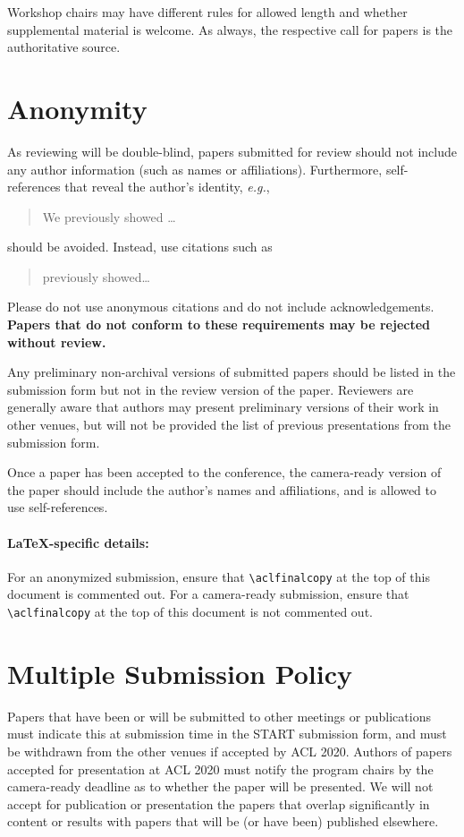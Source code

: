 \documentclass[11pt,a4paper]{article}
\begin{document}
Workshop chairs may have different rules for allowed length and whether supplemental material is welcome.
As always, the respective call for papers is the authoritative source.


\section{Anonymity}
As reviewing will be double-blind, papers submitted for review should not include any author information (such as names or affiliations). Furthermore, self-references that reveal the author's identity, \emph{e.g.},
\begin{quote}
We previously showed \citep{Gusfield:97} \ldots
\end{quote}
should be avoided. Instead, use citations such as 
\begin{quote}
\citet{Gusfield:97} previously showed\ldots
\end{quote}
Please do not use anonymous citations and do not include acknowledgements.
\textbf{Papers that do not conform to these requirements may be rejected without review.}

Any preliminary non-archival versions of submitted papers should be listed in the submission form but not in the review version of the paper.
Reviewers are generally aware that authors may present preliminary versions of their work in other venues, but will not be provided the list of previous presentations from the submission form.

Once a paper has been accepted to the conference, the camera-ready version of the paper should include the author's names and affiliations, and is allowed to use self-references.

\paragraph{\LaTeX-specific details:}
For an anonymized submission, ensure that {\small\verb|\aclfinalcopy|} at the top of this document is commented out. For a camera-ready submission, ensure that {\small\verb|\aclfinalcopy|} at the top of this document is not commented out.


\section{Multiple Submission Policy}
Papers that have been or will be submitted to other meetings or publications must indicate this at submission time in the START submission form, and must be withdrawn from the other venues if accepted by ACL 2020. Authors of papers accepted for presentation at ACL 2020 must notify the program chairs by the camera-ready deadline as to whether the paper will be presented. We will not accept for publication or presentation the papers that overlap significantly in content or results with papers that will be (or have been) published elsewhere.
\end{document}
